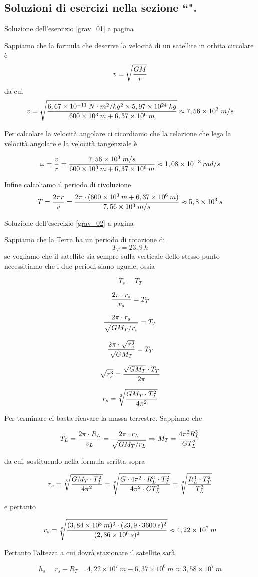 
\subsection*{Soluzioni di esercizi nella sezione ``\textbf{}".}

Soluzione dell'esercizio \ref{grav_01} a pagina \pageref{grav_01}\label{grav_s_01}

Sappiamo che la formula che descrive la velocità di un satellite in orbita circolare è 
\[v=\sqrt{GM\over r}\]
da cui
\[v=\sqrt{6,67\times 10^{-11}\: N\cdot m^2/kg^2\times 5,97\times 10^{24}\; kg \over 600\times 10^3\:m+6,37\times 10^6\:m}\approx 7,56\times 10^3\;m/s\]

Per calcolare la velocità angolare ci ricordiamo che la relazione che lega la velocità angolare e la velocità tangenziale è

\[\omega={v\over r}={7,56\times 10^3\;m/s \over 600\times 10^3\:m+6,37\times 10^6\:m }\approx 1,08\times 10^{-3}\:rad/s\]

Infine calcoliamo il periodo di rivoluzione
\[T={2\pi r\over v}={2\pi\cdot (600\times 10^3\:m+6,37\times 10^6\:m)\over 7,56\times 10^3\;m/s }\approx 5,8\times 10^3\:s\]



Soluzione dell'esercizio \ref{grav_02} a pagina \pageref{grav_02}\label{grav_s_02}


Sappiamo che la Terra ha un periodo di rotazione di \[T_T=23,9\:h\]
se vogliamo che il satellite sia sempre sulla verticale dello stesso punto necessitiamo che i due periodi siano uguale, ossia 

\[T_s=T_T\]

\[{2\pi\cdot r_s\over v_s}=T_T\]

\[{2\pi\cdot r_s\over \sqrt{GM_T/r_s}}=T_T\]

\[{2\pi\cdot \sqrt {r_s^3}\over \sqrt{GM_T}}=T_T\]

\[\sqrt {r_s^3}={\sqrt{GM_T}\cdot T_T\over 2\pi}\]

\[r_s=\sqrt[3]{GM_T\cdot T_T^2\over 4\pi^2}\]

Per terminare ci basta ricavare la massa terrestre. Sappiamo che


\[T_L={2\pi\cdot R_L\over v_L}={2\pi\cdot r_L\over \sqrt{GM_T/r_L}}\Rightarrow M_T={4\pi^2R_L^3\over GT_L^2}\]

da cui, sostituendo nella formula scritta sopra

\[r_s=\sqrt[3]{GM_T\cdot T_T^2\over 4\pi^2}=\sqrt[3]{G\cdot 4\pi^2\cdot R_L^3\cdot T_T^2\over 4\pi^2\cdot GT_L^2}=\sqrt[3]{ R_L^3\cdot T_T^2\over T_L^2}\]

e pertanto

\[r_s=\sqrt[3]{ (3,84\times 10^8\:m)^3\cdot (23,9\cdot 3600\:s)^2\over (2,36\times 10^6\:s)^2}\approx 4,22\times 10^7\: m\]

Pertanto l’altezza a cui dovrà stazionare il satellite sarà


\[h_s=r_s-R_T=4,22\times 10^7\:m-6,37\times 10^6\:m\approx 3,58\times 10^7\:m\]


